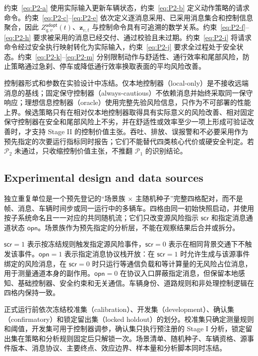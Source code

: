 \documentclass[10pt,a4paper,twocolumn]{article}
\begin{document}
约束~\eqref{eq:P2-a} 使用实际输入更新车辆状态，约束~\eqref{eq:P2-b} 定义动作策略的请求命令。约束~\eqref{eq:P2-c}--\eqref{eq:P2-e} 依次定义逐消息采用、已采用消息集合和控制信息聚合，因此 $Z_{q,v}^{\mathsf{adopt}}(t)$、$\bm z_{v,t}$ 与控制命令具有可追溯的数学关系。约束~\eqref{eq:P2-f}--\eqref{eq:P2-h} 要求被采用的消息已经交付、通过校验且未过期。约束~\eqref{eq:P2-i} 将请求命令经过安全执行映射转化为实际输入，约束~\eqref{eq:P2-j} 要求全过程处于安全状态。约束~\eqref{eq:P2-k}--\eqref{eq:P2-m} 分别限制动作与舒适性、通行效率和尾部风险，防止策略通过急刹、停车或降低通行效率换取表面的平均风险改善。

控制器形式和参数在实验设计中冻结。仅本地控制器（local-only）是不接收远端消息的基线；固定保守控制器（always-cautious）不依赖消息并始终采取同一保守响应；理想信息控制器（oracle）使用完整先验风险信息，只作为不可部署的性能上界。候选策略只有在相对仅本地控制器取得具有实际意义的风险改善、相对固定保守控制器在安全和尾部风险上不劣，并在舒适性或效率至少一项上形成可验证改善时，才支持 Stage II 的控制价值主张。吞吐、排放、误报警和不必要采用作为预先指定的次要运行指标同时报告；它们不能替代四类核心代价或硬安全判定。若 $\mathcal P_2$ 未通过，只收缩控制价值主张，不推翻 $\mathcal P_1$ 的识别结论。

\subsection*{Experimental design and data sources}
独立重复单位是一个预先登记的“场景族 $\times$ 主随机种子”完整四格配对，而不是帧、消息、车辆时间步或同一运行中的多辆车。四格由同一初始快照启动，并使用按子系统命名且一一对应的共同随机流；它们只改变源风险指示 $\mathsf{scr}$ 和指定消息通道状态 $\mathsf{opn}$。场景族作为预先指定的分析层，不能在观察结果后合并或拆分。

$\mathsf{scr}=1$ 表示按冻结规则触发指定源风险事件，$\mathsf{scr}=0$ 表示在相同背景交通下不触发该事件。$\mathsf{opn}=1$ 表示指定消息协议栈开放：在 $\mathsf{scr}=1$ 时允许生成与该源事件绑定的风险消息，在 $\mathsf{scr}=0$ 时只运行等通信负载和等计算量的无风险占位消息，用于测量通道本身的副作用。$\mathsf{opn}=0$ 在协议入口屏蔽指定消息，但保留本地感知、基础控制器、安全约束和无关通信。车辆身份、道路规则和非处理控制逻辑在四格内保持一致。

正式运行前依次冻结校准集（calibration）、开发集（development）、确认集（confirmatory）和锁定留出集（locked holdout）的划分。校准集只确定测量规则和阈值，开发集可用于控制器调参，确认集只执行预注册的 Stage I 分析，锁定留出集在策略和分析规则固定后只解锁一次。场景清单、随机种子、车辆资格、源事件版本、消息协议、主要终点、效应边界、样本量和分析脚本同时冻结。
\end{document}
